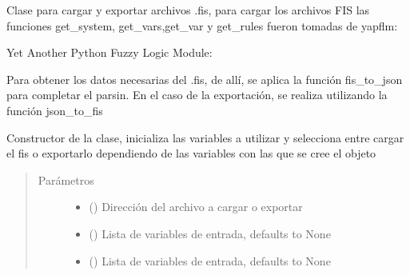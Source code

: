 \documentclass[letterpaper,10pt,spanish]{sphinxmanual}
\begin{document}
\begin{fulllineitems}
\label{\detokenize{codigos/rutinas_fuzzy:rutinas_fuzzy.FISParser}}
Clase para cargar y exportar archivos .fis, para cargar los archivos FIS las funciones get\_system, get\_vars,get\_var y get\_rules fueron tomadas de yapflm:

Yet Another Python Fuzzy Logic Module: 

Para obtener los datos necesarias del .fis, de allí, se aplica la función fis\_to\_json para completar el parsin. En el caso de la exportación, se realiza utilizando la función json\_to\_fis

\begin{fulllineitems}
\label{\detokenize{codigos/rutinas_fuzzy:rutinas_fuzzy.FISParser.__init__}}
Constructor de la clase, inicializa las variables a utilizar y selecciona entre cargar el fis o exportarlo dependiendo de las variables con las que se cree el objeto
\begin{quote}\begin{description}
\item[{Parámetros}] \leavevmode\begin{itemize}
\item {} 
 () \textendash{} Dirección del archivo a cargar o exportar

\item {} 
 (\sphinxstyleliteralemphasis{\sphinxupquote{, }}) \textendash{} Lista de variables de entrada, defaults to None

\item {} 
 (\sphinxstyleliteralemphasis{\sphinxupquote{, }}) \textendash{} Lista de variables de entrada, defaults to None


\end{itemize}
\end{description}
\end{quote}
\end{fulllineitems}
\end{fulllineitems}
\end{document}
